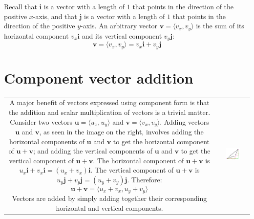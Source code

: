 \documentclass{article}
\begin{document}
Recall that \(\mathbf{i}\) is a vector with a length of \(1\) that points in the direction of the positive \(x\)-axis, and that \(\mathbf{j}\) is a vector with a length of \(1\) that points in the direction of the positive \(y\)-axis. An arbitrary vector \(\mathbf{v} = \langle v_x, v_y\rangle\) is the sum of its horizontal component \(v_x\mathbf{i}\) and its vertical component \(v_y\mathbf{j}\):
\[\mathbf{v} = \langle v_x, v_y\rangle = v_x\mathbf{i} + v_y\mathbf{j}\] 


\section*{Component vector addition}

\begin{tabular}{cc}
\parbox{0.5\textwidth}{
A major benefit of vectors expressed using component form is that the addition and scalar multiplication of vectors is a trivial matter. Consider two vectors \(\mathbf{u} = \langle u_x, u_y \rangle\) and \(\mathbf{v} = \langle v_x, v_y \rangle\). Adding vectors \(\mathbf{u}\) and \(\mathbf{v}\), as seen in the image on the right, involves adding the horizontal components of \(\mathbf{u}\) and \(\mathbf{v}\) to get the horizontal component of \(\mathbf{u} + \mathbf{v}\); and adding the vertical components of \(\mathbf{u}\) and \(\mathbf{v}\) to get the vertical component of \(\mathbf{u} + \mathbf{v}\). The horizontal component of \(\mathbf{u} + \mathbf{v}\) is \(u_x\mathbf{i} + v_x\mathbf{i} = (u_x + v_x)\mathbf{i}\). The vertical component of \(\mathbf{u} + \mathbf{v}\) is \(u_y\mathbf{j} + v_y\mathbf{j} = (u_y + v_y)\mathbf{j}\). Therefore:
\[\mathbf{u} + \mathbf{v} = \langle u_x + v_x, u_y + v_y \rangle\]
Vectors are added by simply adding together their corresponding horizontal and vertical components.
} & \parbox{0.5\textwidth}{
\includegraphics[width = 0.5\textwidth]{component_vector_addition}
}
\end{tabular}
\end{document}
